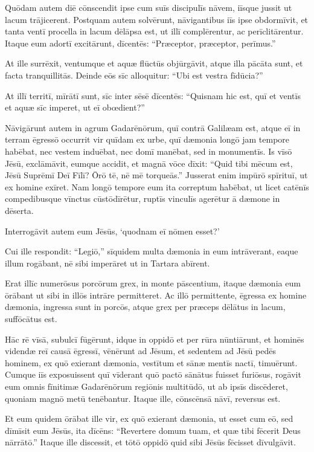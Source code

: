 \Versus Quōdam autem diē cōnscendit ipse cum suīs discipulīs nāvem, iīsque jussit ut lacum trājicerent.
\Versus Postquam autem solvērunt, nāvigantibus iīs ipse obdormīvit, et tanta ventī procella in lacum dēlāpsa est, ut illī complērentur, ac perīclitārentur.
\Versus Itaque eum adortī excitārunt, dīcentēs: ``Præceptor, præceptor, perīmus.''

At ille surrēxit, ventumque et aquæ flūctūs objūrgāvit, atque illa pācāta sunt, et facta tranquillitās.
\Versus Deinde eōs sīc alloquitur: ``Ubi est vestra fīdūcia?''

At illī territī, mīrātī sunt, sīc inter sēsē dīcentēs: ``Quisnam hic est, quī et ventīs et aquæ sīc imperet, ut eī obœdient?''

\Versus Nāvigārunt autem in agrum Gadarēnōrum, quī contrā Galilæam est,
\Versus atque eī in terram ēgressō occurrit vir quīdam ex urbe, quī dæmonia longō jam tempore habēbat, nec vestem induēbat, nec domī manēbat, sed in monumentīs.
\Versus Is vīsō Jēsū, exclāmāvit, eumque accidit, et magnā vōce dīxit: ``Quid tibi mēcum est, Jēsū Suprēmī Deī Fīlī? Ōrō tē, nē mē torqueās.''
\Versus Jusserat enim impūrō spīrituī, ut ex homine exīret. Nam longō tempore eum ita correptum habēbat, ut licet catēnīs compedibusque vīnctus cūstōdīrētur, ruptīs vinculīs agerētur ā dæmone in dēserta.

\Versus Interrogāvit autem eum Jēsūs, `quodnam eī nōmen esset?'

Cui ille respondit: ``Legiō,'' sīquidem multa dæmonia in eum intrāverant,
\Versus eaque illum rogābant, nē sibi imperāret ut in Tartara abīrent.

\Versus Erat illīc numerōsus porcōrum grex, in monte pāscentium, itaque dæmonia eum ōrābant ut sibi in illōs intrāre permitteret.
\Versus Ac illō permittente, ēgressa ex homine dæmonia, ingressa sunt in porcōs, atque grex per præceps dēlātus in lacum, suffōcātus est.

\Versus Hāc rē vīsā, subulcī fūgērunt, idque in oppidō et per rūra nūntiārunt,
\Versus et hominēs videndæ reī causā ēgressī, vēnērunt ad Jēsum, et sedentem ad Jēsū pedēs hominem, ex quō exierant dæmonia, vestītum et sānæ mentīs nactī, timuērunt.
\Versus Cumque iīs exposuissent quī vīderant quō pactō sānātus fuisset furiōsus,
\Versus rogāvit eum omnis fīnitimæ Gadarēnōrum regiōnis multitūdō, ut ab ipsīs discēderet, quoniam magnō metū tenēbantur. Itaque ille, cōnscēnsā nāvī, reversus est.

\Versus Et eum quidem ōrābat ille vir, ex quō exierant dæmonia, ut esset cum eō, sed dīmīsit eum Jēsūs, ita dīcēns:
\Versus ``Revertere domum tuam, et quæ tibi fēcerit Deus nārrātō.'' Itaque ille discessit, et tōtō oppidō quid sibi Jēsūs fēcisset dīvulgāvit.

